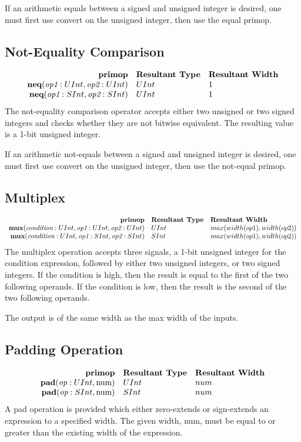 \documentclass[12pt]{article}
\begin{document}
If an arithmetic equals between a signed and unsigned integer is desired, one must first use convert on the unsigned integer, then use the equal primop.

\subsection{Not-Equality Comparison}
\[
\begin{array}{rll}
\text{\bf primop} & \text{\bf Resultant Type} & \text{\bf Resultant Width} \\
\text{\bf neq}(\text{\em op1}:UInt, \text{\em op2}:UInt)     & UInt & 1 \\
\text{\bf neq}(\text{\em op1}:SInt, \text{\em op2}:SInt)     & UInt & 1 \\
\end{array}
\]
The not-equality comparison operator accepts either two unsigned or two signed integers and checks whether they are not bitwise equivalent.
The resulting value is a 1-bit unsigned integer. 

If an arithmetic not-equals between a signed and unsigned integer is desired, one must first use convert on the unsigned integer, then use the not-equal primop.

\subsection{Multiplex}
\[
\begin{array}{rll}
\text{\bf primop} & \text{\bf Resultant Type} & \text{\bf Resultant Width} \\
\text{\bf mux}  (\text{\em condition}:UInt, \text{\em op1}:UInt, \text{\em op2}:UInt) & UInt & max(width(op1),width(op2)) \\
\text{\bf mux}  (\text{\em condition}:UInt, \text{\em op1}:SInt, \text{\em op2}:SInt) & SInt & max(width(op1),width(op2)) \\
\end{array}
\]
The multiplex operation accepts three signals, a 1-bit unsigned integer for the condition expression, followed by either two unsigned integers, or two signed integers.
If the condition is high, then the result is equal to the first of the two following operands.
If the condition is low, then the result is the second of the two following operands. 

The output is of the same width as the max width of the inputs.

\subsection{Padding Operation}
\[
\begin{array}{rll}
\text{\bf primop} & \text{\bf Resultant Type} & \text{\bf Resultant Width} \\
\text{\bf pad}(\text{\em op}:UInt, \text{num})     & UInt & num \\
\text{\bf pad}(\text{\em op}:SInt, \text{num})     & SInt & num \\
\end{array}
\]
A pad operation is provided which either zero-extends or sign-extends an expression to a specified width.
The given width, num, must be equal to or greater than the existing width of the expression. 
\end{document}
